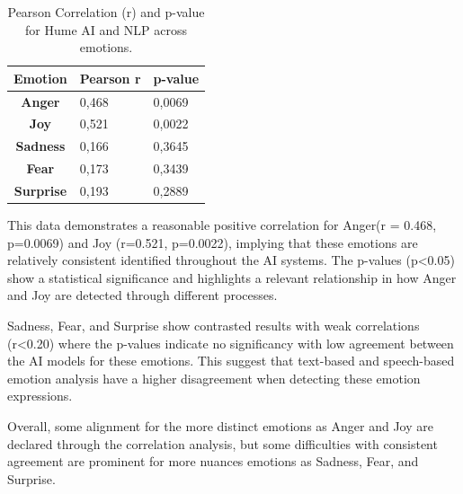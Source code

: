 \begin{table}[!h]
    \centering
    \begin{tabular}{c|ll}
    \rowcolor[HTML]{C0C0C0} 
    \textbf{Emotion}  & \multicolumn{1}{c}{\cellcolor[HTML]{C0C0C0}\textbf{Pearson r}} & \multicolumn{1}{c}{\cellcolor[HTML]{C0C0C0}\textbf{p-value}} \\ \hline
    \textbf{Anger}    & 0,468                                                          & 0,0069                                                       \\
    \textbf{Joy}      & 0,521                                                          & 0,0022                                                       \\
    \textbf{Sadness}  & 0,166                                                          & 0,3645                                                       \\
    \textbf{Fear}     & 0,173                                                          & 0,3439                                                       \\
    \textbf{Surprise} & 0,193                                                          & 0,2889                                                      
    \end{tabular}
    \caption{Pearson Correlation (r) and p-value for Hume AI and NLP across emotions.}
    \label{tab:pearson-pval-rq2}
\end{table}

This data demonstrates a reasonable positive correlation for Anger(r = 0.468, p=0.0069) and Joy (r=0.521, p=0.0022), implying that these emotions are relatively consistent identified throughout the AI systems. 
The p-values (p<0.05) show a statistical significance and highlights a relevant relationship in how Anger and Joy are detected through different processes. 

Sadness, Fear, and Surprise show contrasted results with weak correlations (r<0.20) where the p-values indicate no significancy with low agreement between the AI models for these emotions. 
This suggest that text-based and speech-based emotion analysis have a higher disagreement when detecting these emotion expressions. 

Overall, some alignment for the more distinct emotions as Anger and Joy are declared through the correlation analysis, but some difficulties with consistent agreement are prominent for more nuances emotions as Sadness, Fear, and Surprise. 

